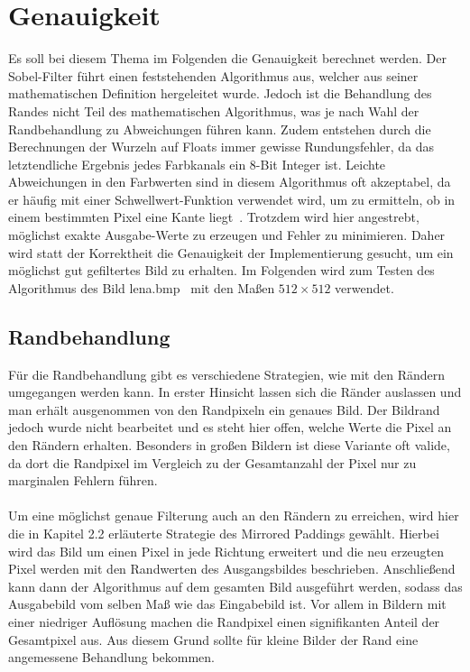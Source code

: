 \documentclass[course=asp]{aspdoc}
\begin{document}
\section{Genauigkeit}
Es soll bei diesem Thema im Folgenden die Genauigkeit berechnet werden. Der Sobel-Filter führt einen feststehenden Algorithmus aus, welcher aus seiner mathematischen Definition hergeleitet wurde. Jedoch ist die Behandlung des Randes nicht Teil des mathematischen Algorithmus, was je nach Wahl der Randbehandlung zu Abweichungen führen kann. Zudem entstehen durch die Berechnungen der Wurzeln auf Floats immer gewisse Rundungsfehler, da das letztendliche Ergebnis jedes Farbkanals ein 8-Bit Integer ist. Leichte Abweichungen in den Farbwerten sind in diesem Algorithmus oft akzeptabel, da er häufig mit einer Schwellwert-Funktion verwendet wird, um zu ermitteln, ob in einem bestimmten Pixel eine Kante liegt~\cite{sobelwiki}. Trotzdem wird hier angestrebt, möglichst exakte Ausgabe-Werte zu erzeugen und Fehler zu minimieren. Daher wird  statt der Korrektheit die Genauigkeit der Implementierung gesucht, um ein möglichst gut gefiltertes Bild zu erhalten. Im Folgenden wird zum Testen des Algorithmus des Bild lena.bmp~\cite{lenabmp} mit den Maßen $512 \times 512$ verwendet.

\subsection{Randbehandlung} \label{Randbehandlung2}
Für die Randbehandlung gibt es verschiedene Strategien, wie mit den Rändern umgegangen werden kann. In erster Hinsicht lassen sich die Ränder auslassen und man erhält ausgenommen von den Randpixeln ein genaues Bild. Der Bildrand jedoch wurde nicht bearbeitet und es steht hier offen, welche Werte die Pixel an den Rändern erhalten. Besonders in großen Bildern ist diese Variante oft valide, da dort die Randpixel im Vergleich zu der Gesamtanzahl der Pixel nur zu marginalen Fehlern führen.\\\\
Um eine möglichst genaue Filterung auch an den Rändern zu erreichen, wird hier die in Kapitel 2.2 erläuterte Strategie des Mirrored Paddings gewählt. Hierbei wird das Bild um einen Pixel in jede Richtung erweitert und die neu erzeugten Pixel werden mit den Randwerten des Ausgangsbildes beschrieben. Anschließend kann dann der Algorithmus auf dem gesamten Bild ausgeführt werden, sodass das Ausgabebild vom selben Maß wie das Eingabebild ist. Vor allem in Bildern mit einer niedriger Auflösung machen die Randpixel einen signifikanten Anteil der Gesamtpixel aus. Aus diesem Grund sollte für kleine Bilder der Rand eine angemessene Behandlung bekommen.
\end{document}
